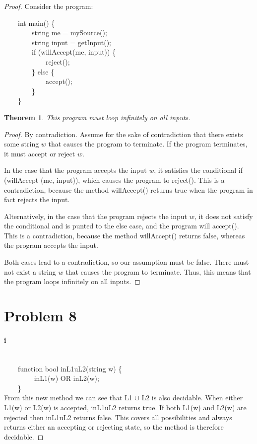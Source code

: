 \documentclass[10pt,letter]{article}
\newtheorem*{thm}{Theorem}
\begin{document}
\begin{proof}
Consider the program:
{\selectfont

$\qquad$int main() \{\\
$\qquad$$\qquad$string me = mySource();\\
$\qquad$$\qquad$string input = getInput();\\
$\qquad$$\qquad$if (willAccept(me, input)) \{\\
$\qquad$$\qquad$$\qquad$reject();\\
$\qquad$$\qquad$\} else \{\\
$\qquad$$\qquad$$\qquad$accept();\\
$\qquad$$\qquad$\}\\
$\qquad$\}
}
\begin{thm}This program must loop infinitely on all inputs.\end{thm}
\begin{proof}
By contradiction. Assume for the sake of contradiction that there exists some string $w$ that causes the program to terminate. If the program terminates, it must accept or reject $w$. 

In the case that the program accepts the input $w$, it satisfies the conditional {\selectfont if (willAccept (me, input))}, which causes the program to {\selectfont reject()}. This is a contradiction, because the method {\selectfont willAccept()} returns true when the program in fact rejects the input.

Alternatively, in the case that the program rejects the input $w$, it does not satisfy the conditional and is punted to the {\selectfont else} case, and the program will {\selectfont accept()}. This is a contradiction, because the method {\selectfont willAccept()} returns false, whereas the program accepts the input.

Both cases lead to a contradiction, so our assumption must be false. There must not exist a string $w$ that causes the program to terminate. Thus, this means that the program loops infinitely on all inputs. 
\end{proof}
\section*{Problem 8}
\paragraph{i}
\ \\
{\selectfont
$\qquad$function bool inL1uL2(string w) \{ \\
$\qquad$$\qquad$  inL1(w) OR inL2(w); \\
$\qquad$\} \\}
From this new method we can see that L1 $\cup$ L2 is also decidable. When either L1(w) or L2(w) is accepted, inL1uL2 returns true. If both L1(w) and L2(w) are rejected then inL1uL2 returns false. This covers all possibilities and always returns either an accepting or rejecting state, so the method is therefore decidable. 


\end{proof}
\end{document}
